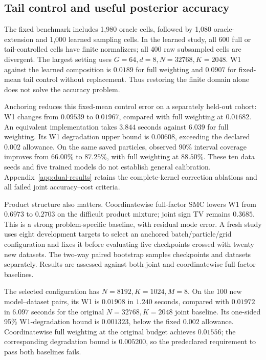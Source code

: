 \subsection{Tail control and useful posterior accuracy}
The fixed benchmark includes 1,980 oracle cells, followed by 1,080 oracle-extension and 1,000 learned sampling cells. In the learned study, all 600 full or tail-controlled cells have finite normalizers; all 400 raw subsampled cells are divergent. The largest setting uses $G=64,d=8,N=32768,K=2048$. W1 against the learned composition is $0.0189$ for full weighting and $0.0907$ for fixed-mean tail control without replacement. Thus restoring the finite domain alone does not solve the accuracy problem.

Anchoring reduces this fixed-mean control error on a separately held-out cohort: W1 changes from $0.09539$ to $0.01967$, compared with full weighting at $0.01682$. An equivalent implementation takes $3.844$ seconds against $6.039$ for full weighting. Its W1 degradation upper bound is $0.00608$, exceeding the declared $0.002$ allowance. On the same saved particles, observed 90\% interval coverage improves from $66.00\%$ to $87.25\%$, with full weighting at $88.50\%$. These ten data seeds and five trained models do not establish general calibration. Appendix~\ref{app:dual-results} retains the complete-kernel correction ablations and all failed joint accuracy--cost criteria.

Product structure also matters. Coordinatewise full-factor SMC lowers W1 from $0.6973$ to $0.2703$ on the difficult product mixture; joint sign TV remains $0.3685$. This is a strong problem-specific baseline, with residual mode error. A fresh study uses eight development targets to select an anchored batch/particle/grid configuration and fixes it before evaluating five checkpoints crossed with twenty new datasets. The two-way paired bootstrap samples checkpoints and datasets separately. Results are assessed against both joint and coordinatewise full-factor baselines.

The selected configuration has $N=8192,K=1024,M=8$. On the 100 new model--dataset pairs, its W1 is $0.01908$ in $1.240$ seconds, compared with $0.01972$ in $6.097$ seconds for the original $N=32768,K=2048$ joint baseline. Its one-sided 95\% W1-degradation bound is $0.001323$, below the fixed $0.002$ allowance. Coordinatewise full weighting at the original budget achieves $0.01556$; the corresponding degradation bound is $0.005200$, so the predeclared requirement to pass both baselines fails.

